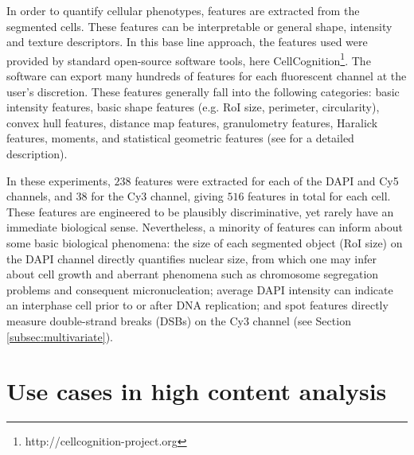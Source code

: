 In order to quantify cellular phenotypes, features are extracted from the segmented cells. These features can be interpretable or general shape, intensity and texture descriptors. In this base line approach, the features used were provided by standard open-source software tools, here CellCognition\footnote{http://cellcognition-project.org}. The software can export many hundreds of features for each fluorescent channel at the user's discretion. These features generally fall into the following categories: basic intensity features, basic shape features (e.g. RoI size, perimeter, circularity), convex hull features, distance map features, granulometry features, Haralick features, moments, and statistical geometric features (see \cite{held2010cellcognition, walter2010automatic} for a detailed description).

%

In these experiments, $238$ features were extracted for each of the DAPI and Cy5 channels, and $38$ for the Cy3 channel, giving $516$ features in total for each cell. These features are engineered to be plausibly discriminative, yet rarely have an immediate biological sense. Nevertheless, a minority of features can inform about some basic biological phenomena: the size of each segmented object (RoI size) on the DAPI channel directly quantifies nuclear size, from which one may infer about cell growth and aberrant phenomena such as chromosome segregation problems and consequent micronucleation; average DAPI intensity can indicate an interphase cell prior to or after DNA replication; and spot features directly measure double-strand breaks (DSBs) on the Cy3 channel (see Section \ref{subsec:multivariate}).

\section{Use cases in high content analysis}
\label{sec:use_cases}


